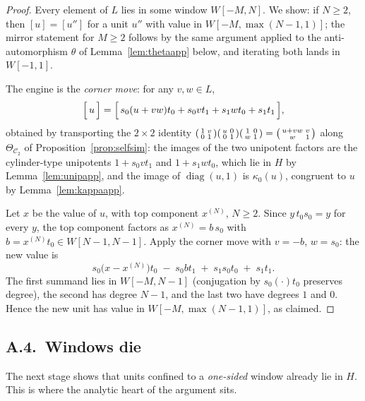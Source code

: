 \documentclass[11pt]{amsart}
\theoremstyle{definition}
\theoremstyle{plain}
\DeclareMathOperator{\diag}{diag}
\begin{document}
\begin{proof}
Every element of \(L\) lies in some window \(W[-M,N]\).  We show: if \(N\geq2\), then \([u]=[u'']\) for a unit \(u''\) with value in \(W[-M,\max(N-1,1)]\); the mirror statement for \(M\geq2\) follows by the same argument applied to the anti-automorphism \(\theta\) of Lemma~\ref{lem:thetaapp} below, and iterating both lands in \(W[-1,1]\).

The engine is the \emph{corner move}: for any \(v,w\in L\),
\[
 \Bigl[\,u\,\Bigr]=\Bigl[\,s_0(u+vw)t_0+s_0vt_1+s_1wt_0+s_1t_1\,\Bigr],
\]
obtained by transporting the \(2\times2\) identity
\(\begin{psmallmatrix}1&v\\ 0&1\end{psmallmatrix}
 \begin{psmallmatrix}u&0\\ 0&1\end{psmallmatrix}
 \begin{psmallmatrix}1&0\\ w&1\end{psmallmatrix}
 =\begin{psmallmatrix}u+vw&v\\ w&1\end{psmallmatrix}\)
along \(\Theta_{\mathcal C_2}\) of Proposition~\ref{prop:selfsim}: the images of the two unipotent factors are the cylinder-type unipotents \(1+s_0vt_1\) and \(1+s_1wt_0\), which lie in \(H\) by Lemma~\ref{lem:unipapp}, and the image of \(\diag(u,1)\) is \(\kappa_0(u)\), congruent to \(u\) by Lemma~\ref{lem:kappaapp}.

Let \(x\) be the value of \(u\), with top component \(x^{(N)}\), \(N\geq2\).  Since \(y\,t_0s_0=y\) for every \(y\), the top component factors as \(x^{(N)}=b\,s_0\) with \(b=x^{(N)}t_0\in W[N-1,N-1]\).  Apply the corner move with \(v=-b\), \(w=s_0\): the new value is
\[
 s_0\bigl(x-x^{(N)}\bigr)t_0\;-\;s_0bt_1\;+\;s_1s_0t_0\;+\;s_1t_1 .
\]
The first summand lies in \(W[-M,N-1]\) (conjugation by \(s_0(\cdot)t_0\) preserves degree), the second has degree \(N-1\), and the last two have degrees \(1\) and \(0\).  Hence the new unit has value in \(W[-M,\max(N-1,1)]\), as claimed.
\end{proof}

\subsection*{A.4.\ Windows die}

The next stage shows that units confined to a \emph{one-sided} window already lie in \(H\).  This is where the analytic heart of the argument sits.
\end{document}
